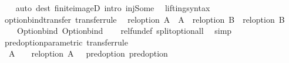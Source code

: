 \begin{isabellebody}
%
\isadelimproof
\ \ %
\endisadelimproof
%
\isatagproof
{}\isamarkupfalse%
\ {\isacharparenleft}{\kern0pt}auto\ dest{\isacharcolon}{\kern0pt}\ finite{\isacharunderscore}{\kern0pt}imageD\ intro{\isacharcolon}{\kern0pt}\ inj{\isacharunderscore}{\kern0pt}Some{\isacharparenright}{\kern0pt}%
\endisatagproof
{\isafoldproof}%
%
\isadelimproof
%
\endisadelimproof
%
\isadelimdocument
%
\endisadelimdocument
%
\isatagdocument
%
\isamarkuptrue%
%
\endisatagdocument
{\isafolddocument}%
%
\isadelimdocument
%
\endisadelimdocument
{}\isamarkupfalse%
\ \ lifting{\isacharunderscore}{\kern0pt}syntax\isanewline
{}\isanewline
\isanewline
{}\isamarkupfalse%
\ option{\isacharunderscore}{\kern0pt}bind{\isacharunderscore}{\kern0pt}transfer\ {\isacharbrackleft}{\kern0pt}transfer{\isacharunderscore}{\kern0pt}rule{\isacharbrackright}{\kern0pt}{\isacharcolon}{\kern0pt}\isanewline
\ \ {\isachardoublequoteopen}{\isacharparenleft}{\kern0pt}rel{\isacharunderscore}{\kern0pt}option\ A\ {\isacharequal}{\kern0pt}{\isacharequal}{\kern0pt}{\isacharequal}{\kern0pt}{\isachargreater}{\kern0pt}\ {\isacharparenleft}{\kern0pt}A\ {\isacharequal}{\kern0pt}{\isacharequal}{\kern0pt}{\isacharequal}{\kern0pt}{\isachargreater}{\kern0pt}\ rel{\isacharunderscore}{\kern0pt}option\ B{\isacharparenright}{\kern0pt}\ {\isacharequal}{\kern0pt}{\isacharequal}{\kern0pt}{\isacharequal}{\kern0pt}{\isachargreater}{\kern0pt}\ rel{\isacharunderscore}{\kern0pt}option\ B{\isacharparenright}{\kern0pt}\isanewline
\ \ \ \ Option{\isachardot}{\kern0pt}bind\ Option{\isachardot}{\kern0pt}bind{\isachardoublequoteclose}\isanewline
%
\isadelimproof
\ \ %
\endisadelimproof
%
\isatagproof
{}\isamarkupfalse%
\ rel{\isacharunderscore}{\kern0pt}fun{\isacharunderscore}{\kern0pt}def\ split{\isacharunderscore}{\kern0pt}option{\isacharunderscore}{\kern0pt}all\ \isamarkupfalse%
\ simp%
\endisatagproof
{\isafoldproof}%
%
\isadelimproof
\isanewline
%
\endisadelimproof
\isanewline
{}\isamarkupfalse%
\ pred{\isacharunderscore}{\kern0pt}option{\isacharunderscore}{\kern0pt}parametric\ {\isacharbrackleft}{\kern0pt}transfer{\isacharunderscore}{\kern0pt}rule{\isacharbrackright}{\kern0pt}{\isacharcolon}{\kern0pt}\isanewline
\ \ {\isachardoublequoteopen}{\isacharparenleft}{\kern0pt}{\isacharparenleft}{\kern0pt}A\ {\isacharequal}{\kern0pt}{\isacharequal}{\kern0pt}{\isacharequal}{\kern0pt}{\isachargreater}{\kern0pt}\ {\isacharparenleft}{\kern0pt}{\isacharequal}{\kern0pt}{\isacharparenright}{\kern0pt}{\isacharparenright}{\kern0pt}\ {\isacharequal}{\kern0pt}{\isacharequal}{\kern0pt}{\isacharequal}{\kern0pt}{\isachargreater}{\kern0pt}\ rel{\isacharunderscore}{\kern0pt}option\ A\ {\isacharequal}{\kern0pt}{\isacharequal}{\kern0pt}{\isacharequal}{\kern0pt}{\isachargreater}{\kern0pt}\ {\isacharparenleft}{\kern0pt}{\isacharequal}{\kern0pt}{\isacharparenright}{\kern0pt}{\isacharparenright}{\kern0pt}\ pred{\isacharunderscore}{\kern0pt}option\ pred{\isacharunderscore}{\kern0pt}option{\isachardoublequoteclose}\isanewline

\end{isabellebody}
